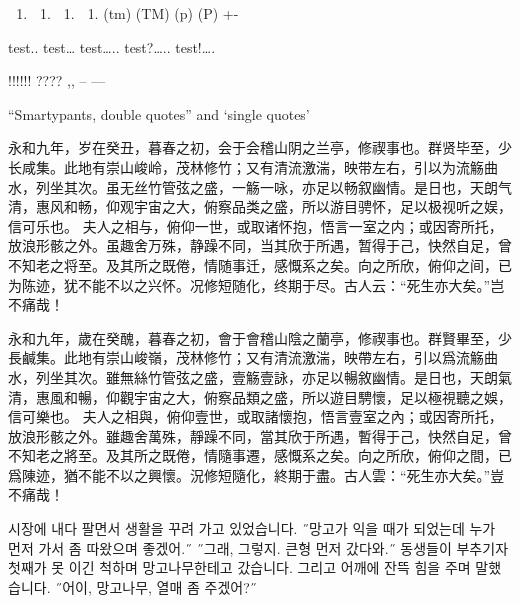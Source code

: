\documentclass[
  paper=a4,
  ,captions=tableheading
]{scrartcl}
\providecommand{\tightlist}{%
  \setlength{\itemsep}{0pt}\setlength{\parskip}{0pt}}
\begin{document}
\begin{enumerate}
\def\labelenumi{(\alph{enumi})}
\setcounter{enumi}{2}
\item
  \begin{enumerate}
  \def\labelenumii{(\Alph{enumii})}
  \setcounter{enumii}{2}
  \item
    \begin{enumerate}
    \def\labelenumiii{(\alph{enumiii})}
    \setcounter{enumiii}{17}
    \item
      \begin{enumerate}
      \def\labelenumiv{(\Alph{enumiv})}
      \setcounter{enumiv}{17}
      \tightlist
      \item
        (tm) (TM) (p) (P) +-
      \end{enumerate}
    \end{enumerate}
  \end{enumerate}
\end{enumerate}

test.. test\ldots{} test\ldots.. test?\ldots.. test!\ldots.

!!!!!! ???? ,, -- ---

``Smartypants, double quotes'' and `single quotes'

永和九年，岁在癸丑，暮春之初，会于会稽山阴之兰亭，修禊事也。群贤毕至，少长咸集。此地有崇山峻岭，茂林修竹；又有清流激湍，映带左右，引以为流觞曲水，列坐其次。虽无丝竹管弦之盛，一觞一咏，亦足以畅叙幽情。是日也，天朗气清，惠风和畅，仰观宇宙之大，俯察品类之盛，所以游目骋怀，足以极视听之娱，信可乐也。
夫人之相与，俯仰一世，或取诸怀抱，悟言一室之内；或因寄所托，放浪形骸之外。虽趣舍万殊，静躁不同，当其欣于所遇，暂得于己，快然自足，曾不知老之将至。及其所之既倦，情随事迁，感慨系之矣。向之所欣，俯仰之间，已为陈迹，犹不能不以之兴怀。况修短随化，终期于尽。古人云：``死生亦大矣。''岂不痛哉！

永和九年，歲在癸醜，暮春之初，會于會稽山陰之蘭亭，修禊事也。群賢畢至，少長鹹集。此地有崇山峻嶺，茂林修竹；又有清流激湍，映帶左右，引以爲流觞曲水，列坐其次。雖無絲竹管弦之盛，壹觞壹詠，亦足以暢敘幽情。是日也，天朗氣清，惠風和暢，仰觀宇宙之大，俯察品類之盛，所以遊目騁懷，足以極視聽之娛，信可樂也。
夫人之相與，俯仰壹世，或取諸懷抱，悟言壹室之內；或因寄所托，放浪形骸之外。雖趣舍萬殊，靜躁不同，當其欣于所遇，暫得于己，快然自足，曾不知老之將至。及其所之既倦，情隨事遷，感慨系之矣。向之所欣，俯仰之間，已爲陳迹，猶不能不以之興懷。況修短隨化，終期于盡。古人雲：``死生亦大矣。''豈不痛哉！

시장에 내다 팔면서 생활을 꾸려 가고 있었습니다. ˝망고가 익을 때가
되었는데 누가 먼저 가서 좀 따왔으며 좋겠어.˝ ˝그래, 그렇지. 큰형 먼저
갔다와.˝ 동생들이 부추기자 첫째가 못 이긴 척하며 망고나무한테고
갔습니다. 그리고 어깨에 잔뜩 힘을 주며 말했습니다. ˝어이, 망고나무, 열매
좀 주겠어?˝
\end{document}
